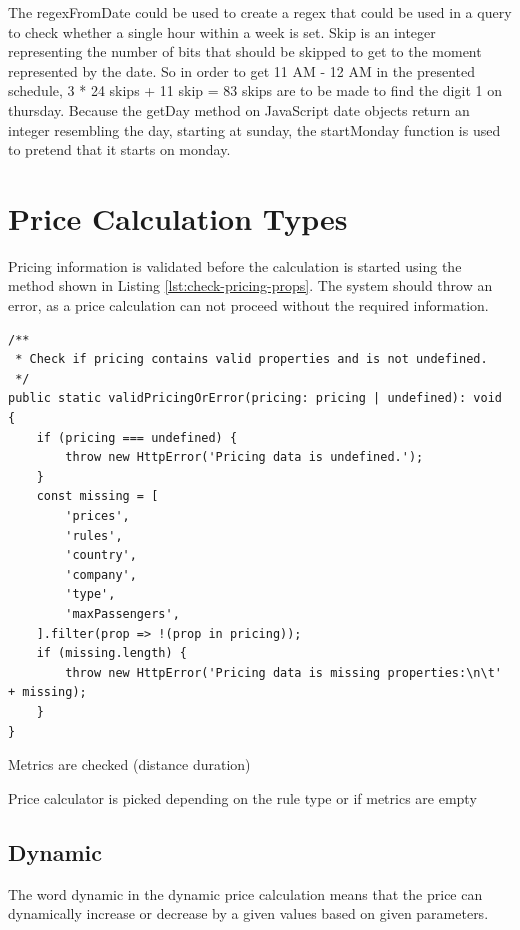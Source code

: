 The regexFromDate could be used to create a regex that could be used in a query to check whether a single hour within a week is set. Skip is an integer representing the number of bits that should be skipped to get to the moment represented by the date. So in order to get 11 AM - 12 AM in the presented schedule, 3 * 24 skips + 11 skip = 83 skips are to be made to find the digit 1 on thursday. Because the getDay method on JavaScript date objects return an integer resembling the day, starting at sunday, the startMonday function is used to pretend that it starts on monday.


\section{Price Calculation Types}
Pricing information is validated before the calculation is started using the method shown in Listing \ref{lst:check-pricing-props}. The system should throw an error, as a price calculation can not proceed without the required information.

\begin{lstlisting}[caption={Find missing properties.}, label={lst:check-pricing-props}]
/**
 * Check if pricing contains valid properties and is not undefined.
 */
public static validPricingOrError(pricing: pricing | undefined): void {
	if (pricing === undefined) {
		throw new HttpError('Pricing data is undefined.');
	}
	const missing = [
		'prices',
		'rules',
		'country',
		'company',
		'type',
		'maxPassengers',
	].filter(prop => !(prop in pricing));
	if (missing.length) {
		throw new HttpError('Pricing data is missing properties:\n\t' + missing);
	}
}
\end{lstlisting}


Metrics are checked (distance duration)

Price calculator is picked depending on the rule type or if metrics are empty

\subsection{Dynamic}
The word dynamic in the dynamic price calculation means that the price can dynamically increase or decrease by a given values based on given parameters.
